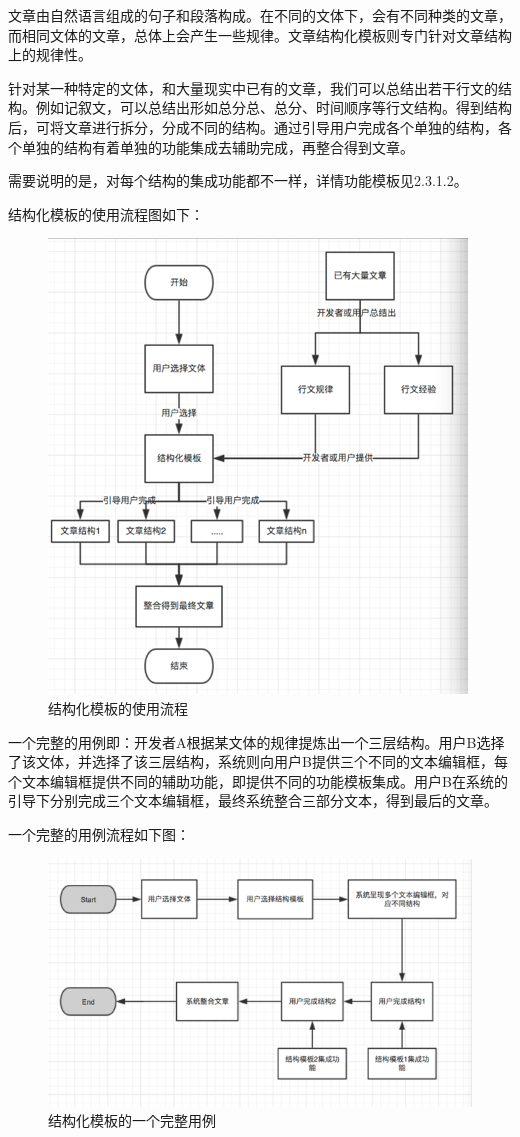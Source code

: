 \documentclass[10pt,letterpaper]{article}
\begin{document}
文章由自然语言组成的句子和段落构成。在不同的文体下，会有不同种类的文章，而相同文体的文章，总体上会产生一些规律。文章结构化模板则专门针对文章结构上的规律性。

针对某一种特定的文体，和大量现实中已有的文章，我们可以总结出若干行文的结构。例如记叙文，可以总结出形如总分总、总分、时间顺序等行文结构。得到结构后，可将文章进行拆分，分成不同的结构。通过引导用户完成各个单独的结构，各个单独的结构有着单独的功能集成去辅助完成，再整合得到文章。

需要说明的是，对每个结构的集成功能都不一样，详情功能模板见2.3.1.2。

结构化模板的使用流程图如下：

\begin{figure}[H]
	\begin{center}
		\includegraphics[width=0.5\linewidth]{___1.png}
		\caption{结构化模板的使用流程}
		\label{Fig:1}
	\end{center}
	\vspace{-0.5em}
\end{figure}

一个完整的用例即：开发者A根据某文体的规律提炼出一个三层结构。用户B选择了该文体，并选择了该三层结构，系统则向用户B提供三个不同的文本编辑框，每个文本编辑框提供不同的辅助功能，即提供不同的功能模板集成。用户B在系统的引导下分别完成三个文本编辑框，最终系统整合三部分文本，得到最后的文章。

一个完整的用例流程如下图：

\begin{figure}[H]
	\begin{center}
		\includegraphics[width=0.5\linewidth]{___2.png}
		\caption{结构化模板的一个完整用例}
		\label{Fig:1}
	\end{center}
	\vspace{-0.5em}
\end{figure}
\end{document}
